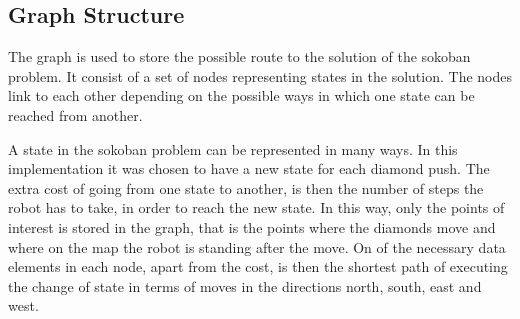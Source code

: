 
\subsection{Graph Structure}
The graph is used to store the possible route to the solution of the sokoban problem.
It consist of a set of nodes representing states in the solution.
The nodes link to each other depending on the possible ways in which one state can be reached from another.

A state in the sokoban problem can be represented in many ways.
In this implementation it was chosen to have a new state for each diamond push.
The extra cost of going from one state to another, is then the number of steps the robot has to take, in order to reach the new state.
In this way, only the points of interest is stored in the graph, that is the points where the diamonds move and where on the map the robot is standing after the move.
On of the necessary data elements in each node, apart from the cost, is then the shortest path of executing the change of state in terms of moves in the directions north, south, east and west.


